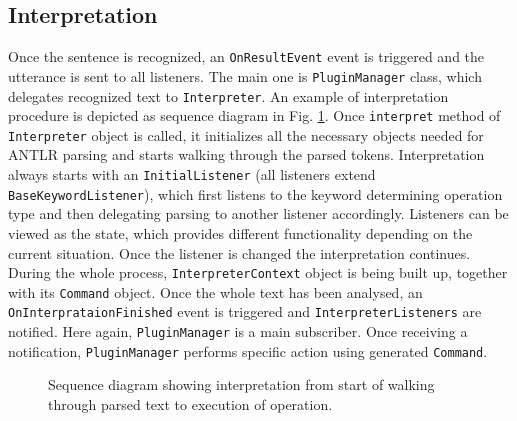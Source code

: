 \subsection{Interpretation}

Once the sentence is recognized, an \texttt{OnResultEvent} event is triggered and the utterance is sent to all listeners. The main one is \texttt{PluginManager} class, which delegates recognized text to \texttt{Interpreter}. An example of interpretation procedure is depicted as sequence diagram in Fig. \ref{fig:sequenceInterpretation}. Once \texttt{interpret} method of \texttt{Interpreter} object is called, it initializes all the necessary objects needed for ANTLR parsing and starts walking through the parsed tokens. Interpretation always starts with an \texttt{InitialListener} (all listeners extend \texttt{BaseKeywordListener}), which first listens to the keyword determining operation type and then delegating parsing to another listener accordingly. Listeners can be viewed as the state, which provides different functionality depending on the current situation. Once the listener is changed the interpretation continues. During the whole process, \texttt{InterpreterContext} object is being built up, together with its \texttt{Command} object. Once the whole text has been analysed, an \texttt{OnInterprataionFinished} event is triggered and \texttt{InterpreterListeners} are notified. Here again, \texttt{PluginManager} is a main subscriber. Once receiving a notification, \texttt{PluginManager} performs specific action using generated \texttt{Command}.

\begin{figure}
    \centering
    \caption{Sequence diagram showing interpretation from start of walking through parsed text to execution of operation.}
    \label{fig:sequenceInterpretation}
\end{figure}

